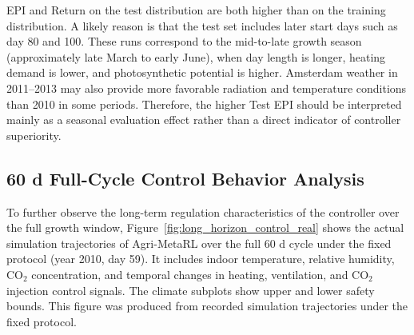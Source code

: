 \documentclass[number,preprint,review,12pt]{elsarticle}
\begin{document}
EPI and Return on the test distribution are both higher than on the training distribution. A likely reason is that the test set includes later start days such as day 80 and 100. These runs correspond to the mid-to-late growth season (approximately late March to early June), when day length is longer, heating demand is lower, and photosynthetic potential is higher. Amsterdam weather in 2011--2013 may also provide more favorable radiation and temperature conditions than 2010 in some periods. Therefore, the higher Test EPI should be interpreted mainly as a seasonal evaluation effect rather than a direct indicator of controller superiority.

\begin{table}[H]
\centering
\caption{Comprehensive performance comparison of controllers on training and held-out test distributions}
\label{tab:greenlight_gym}
\end{table}

\subsection{60 d Full-Cycle Control Behavior Analysis}
To further observe the long-term regulation characteristics of the controller over the full growth window, Figure~\ref{fig:long_horizon_control_real} shows the actual simulation trajectories of Agri-MetaRL over the full 60 d cycle under the fixed protocol (year 2010, day 59). It includes indoor temperature, relative humidity, CO$_2$ concentration, and temporal changes in heating, ventilation, and CO$_2$ injection control signals. The climate subplots show upper and lower safety bounds. This figure was produced from recorded simulation trajectories under the fixed protocol.
\end{document}
